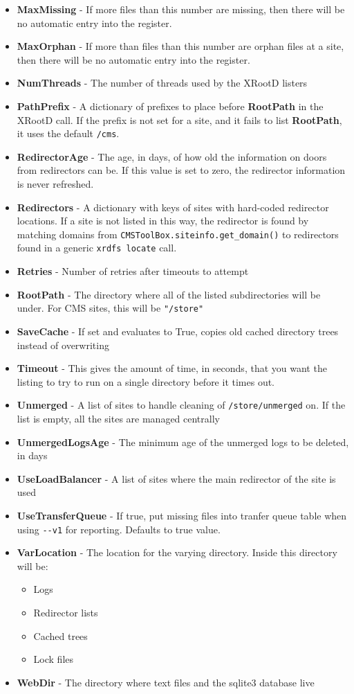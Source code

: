 \begin{itemize}
\item {\bf MaxMissing} - If more files than this number are missing,
then there will be no automatic entry into the register.
\item {\bf MaxOrphan} - If more than files than this number are orphan files at a site,
then there will be no automatic entry into the register.
\item {\bf NumThreads} - The number of threads used by the XRootD listers
\item {\bf PathPrefix} - A dictionary of prefixes to place before {\bf RootPath} in the XRootD call.
If the prefix is not set for a site, and it fails to list {\bf RootPath}, it uses the default \texttt{/cms}.
\item {\bf RedirectorAge} - The age, in days, of how old the information on doors from redirectors can be.
If this value is set to zero, the redirector information is never refreshed.
\item {\bf Redirectors} - A dictionary with keys of sites with hard-coded redirector locations.
If a site is not listed in this way, the redirector is found by matching domains from
\texttt{CMSToolBox.siteinfo.get\_domain()} to redirectors found in a generic \texttt{xrdfs locate} call.
\item {\bf Retries} - Number of retries after timeouts to attempt
\item {\bf RootPath} - The directory where all of the listed subdirectories will be under.
For CMS sites, this will be \texttt{"/store"}
\item {\bf SaveCache} - If set and evaluates to True, copies old cached directory trees instead of overwriting
\item {\bf Timeout} - This gives the amount of time, in seconds, that you want the listing to try to run
on a single directory before it times out.
\item {\bf Unmerged} - A list of sites to handle cleaning of \texttt{/store/unmerged} on.
If the list is empty, all the sites are managed centrally
\item {\bf UnmergedLogsAge} - The minimum age of the unmerged logs to be deleted, in days
\item {\bf UseLoadBalancer} - A list of sites where the main redirector of the site is used
\item {\bf UseTransferQueue} - If true, put missing files into tranfer queue table
when using \texttt{-{-}v1} for reporting. Defaults to true value.
\item {\bf VarLocation} - The location for the varying directory.
Inside this directory will be:
\begin{itemize}
\item Logs
\item Redirector lists
\item Cached trees
\item Lock files
\end{itemize}
\item {\bf WebDir} - The directory where text files and the sqlite3 database live
\end{itemize}

